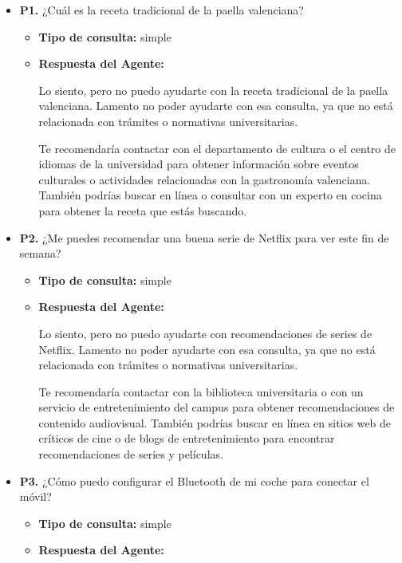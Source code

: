 \documentclass{article}
\begin{document}
\begin{itemize}
  \item \textbf{P1.} ¿Cuál es la receta tradicional de la paella valenciana? \\
        \begin{itemize}
          \item \textbf{Tipo de consulta:} simple
          \item \textbf{Respuesta del Agente:}

                Lo siento, pero no puedo ayudarte con la receta tradicional de la paella valenciana. Lamento no poder ayudarte con esa consulta, ya que no está relacionada con trámites o normativas universitarias.

                Te recomendaría contactar con el departamento de cultura o el centro de idiomas de la universidad para obtener información sobre eventos culturales o actividades relacionadas con la gastronomía valenciana. También podrías buscar en línea o consultar con un experto en cocina para obtener la receta que estás buscando.
        \end{itemize}


  \item \textbf{P2.} ¿Me puedes recomendar una buena serie de Netflix para ver este fin de semana? \\
        \begin{itemize}
          \item \textbf{Tipo de consulta:} simple
          \item \textbf{Respuesta del Agente:}

                Lo siento, pero no puedo ayudarte con recomendaciones de series de Netflix. Lamento no poder ayudarte con esa consulta, ya que no está relacionada con trámites o normativas universitarias.

                Te recomendaría contactar con la biblioteca universitaria o con un servicio de entretenimiento del campus para obtener recomendaciones de contenido audiovisual. También podrías buscar en línea en sitios web de críticos de cine o de blogs de entretenimiento para encontrar recomendaciones de series y películas.
        \end{itemize}


  \item \textbf{P3.} ¿Cómo puedo configurar el Bluetooth de mi coche para conectar el móvil? \\
        \begin{itemize}
          \item \textbf{Tipo de consulta:} simple
          \item \textbf{Respuesta del Agente:}


\end{itemize}
\end{itemize}
\end{document}
